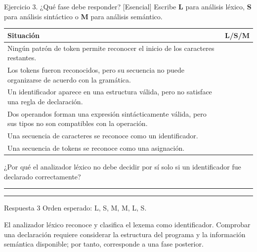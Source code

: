 \documentclass[11pt,spanish]{article}
\newcommand{\blank}[1][4cm]{\rule{#1}{0.4pt}}
\begin{document}
\begin{ejercicio}{Ejercicio 3. ¿Qué fase debe responder? \hfill {\small [Esencial]}}
Escribe \textbf{L} para análisis léxico, \textbf{S} para análisis sintáctico o \textbf{M} para análisis semántico.

\begin{center}
\small
\begin{tabular}{|p{}|p{}|}
\hline
\textbf{Situación} & \textbf{L/S/M} \tabularnewline
\hline
Ningún patrón de token permite reconocer el inicio de los caracteres restantes. & \tabularnewline[0.62cm]
\hline
Los tokens fueron reconocidos, pero su secuencia no puede organizarse de acuerdo con la gramática. & \tabularnewline[0.62cm]
\hline
Un identificador aparece en una estructura válida, pero no satisface una regla de declaración. & \tabularnewline[0.62cm]
\hline
Dos operandos forman una expresión sintácticamente válida, pero sus tipos no son compatibles con la operación. & \tabularnewline[0.62cm]
\hline
Una secuencia de caracteres se reconoce como un identificador. & \tabularnewline[0.62cm]
\hline
Una secuencia de tokens se reconoce como una asignación. & \tabularnewline[0.62cm]
\hline
\end{tabular}
\end{center}

¿Por qué el analizador léxico no debe decidir por sí solo si un identificador fue declarado correctamente?

\ifrespuestas\else
\blank[14cm]

\blank[14cm]
\fi
\end{ejercicio}

\ifrespuestas
\begin{respuesta}{Respuesta 3}
Orden esperado: L, S, M, M, L, S.

El analizador léxico reconoce y clasifica el lexema como identificador. Comprobar una declaración requiere considerar la estructura del programa y la información semántica disponible; por tanto, corresponde a una fase posterior.
\end{respuesta}
\fi
\end{document}
